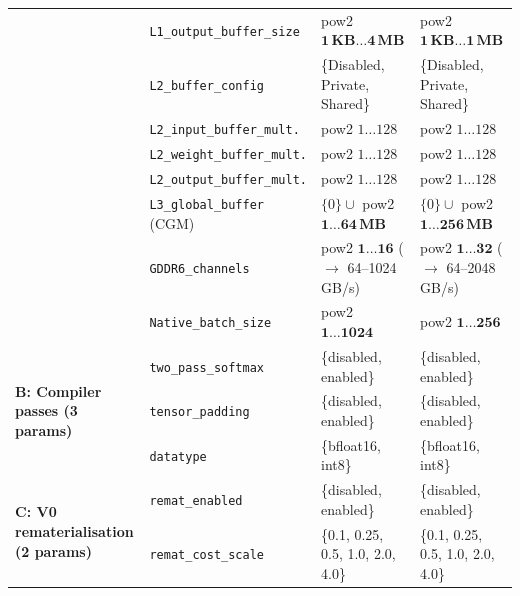 \begin{table}[h]
{\begin{tabular}{llll}
 & \texttt{L1\_output\_buffer\_size}   & pow2 $\mathbf{1\,\text{KB} \ldots 4\,\text{MB}}$        & pow2 $\mathbf{1\,\text{KB} \ldots 1\,\text{MB}}$       \\
 & \texttt{L2\_buffer\_config}         & \{Disabled, Private, Shared\}                           & \{Disabled, Private, Shared\}                          \\
 & \texttt{L2\_input\_buffer\_mult.}   & pow2 $1 \ldots 128$                                     & pow2 $1 \ldots 128$                                    \\
 & \texttt{L2\_weight\_buffer\_mult.}  & pow2 $1 \ldots 128$                                     & pow2 $1 \ldots 128$                                    \\
 & \texttt{L2\_output\_buffer\_mult.}  & pow2 $1 \ldots 128$                                     & pow2 $1 \ldots 128$                                    \\
 & \texttt{L3\_global\_buffer} (CGM)   & $\{0\} \cup$ pow2 $\mathbf{1 \ldots 64\,\text{MB}}$     & $\{0\} \cup$ pow2 $\mathbf{1 \ldots 256\,\text{MB}}$   \\
 & \texttt{GDDR6\_channels}            & pow2 $\mathbf{1 \ldots 16}$ ($\to$ 64–1024 GB/s)        & pow2 $\mathbf{1 \ldots 32}$ ($\to$ 64–2048 GB/s)       \\
 & \texttt{Native\_batch\_size}        & pow2 $\mathbf{1 \ldots 1024}$                           & pow2 $\mathbf{1 \ldots 256}$                           \\
\midrule
\multirow{3}{*}{\textbf{B: Compiler passes (3 params)}}
 & \texttt{two\_pass\_softmax}         & \{disabled, enabled\}                                   & \{disabled, enabled\}                                  \\
 & \texttt{tensor\_padding}            & \{disabled, enabled\}                                   & \{disabled, enabled\}                                  \\
 & \texttt{datatype}                   & \{bfloat16, int8\}                                      & \{bfloat16, int8\}                                     \\
\midrule
\multirow{2}{*}{\textbf{C: V0 rematerialisation (2 params)}}
 & \texttt{remat\_enabled}             & \{disabled, enabled\}                                   & \{disabled, enabled\}                                  \\
 & \texttt{remat\_cost\_scale}         & \{0.1, 0.25, 0.5, 1.0, 2.0, 4.0\}                      & \{0.1, 0.25, 0.5, 1.0, 2.0, 4.0\}                     \\

\end{tabular}}
\end{table}
